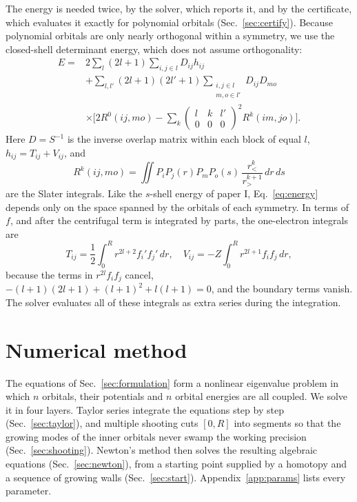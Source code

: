 \documentclass[aps,pra,reprint,superscriptaddress,amsmath,amssymb,longbibliography]{revtex4-2}
\begin{document}
The energy is needed twice, by the solver, which reports it, and by the certificate, which evaluates it exactly for polynomial orbitals (Sec.~\ref{sec:certify}). Because polynomial orbitals are only nearly orthogonal within a symmetry, we use the closed-shell determinant energy, which does not assume orthogonality:
\begin{equation}
\begin{split}
E={}&2\sum_l(2l+1)\sum_{i,j\in l}D_{ij}h_{ij}\\
&+\sum_{l,l'}(2l+1)(2l'+1)\sum_{\substack{i,j\in l\\m,o\in l'}}D_{ij}D_{mo}\\
&\times\Big[2R^0(ij,mo)-\sum_k\begin{pmatrix}l&k&l'\\0&0&0\end{pmatrix}^2R^k(im,jo)\Big].
\end{split}\label{eq:energy}
\end{equation}
Here $D=S^{-1}$ is the inverse overlap matrix within each block of equal $l$, $h_{ij}=T_{ij}+V_{ij}$, and
\begin{equation}
R^k(ij,mo)=\iint P_iP_j(r)P_mP_o(s)\,\frac{r_<^k}{r_>^{k+1}}\,dr\,ds
\end{equation}
are the Slater integrals. Like the $s$-shell energy of paper I, Eq.~\eqref{eq:energy} depends only on the space spanned by the orbitals of each symmetry. In terms of $f$, and after the centrifugal term is integrated by parts, the one-electron integrals are
\begin{equation}
T_{ij}=\frac12\int_0^Rr^{2l+2}f_i'f_j'\,dr,\quad V_{ij}=-Z\int_0^Rr^{2l+1}f_if_j\,dr, \label{eq:onebody}
\end{equation}
because the terms in $r^{2l}f_if_j$ cancel, $-(l+1)(2l+1)+(l+1)^2+l(l+1)=0$, and the boundary terms vanish. The solver evaluates all of these integrals as extra series during the integration.

\section{Numerical method}\label{sec:numerics}

The equations of Sec.~\ref{sec:formulation} form a nonlinear eigenvalue problem in which $n$ orbitals, their potentials and $n$ orbital energies are all coupled. We solve it in four layers. Taylor series integrate the equations step by step (Sec.~\ref{sec:taylor}), and multiple shooting cuts $[0,R]$ into segments so that the growing modes of the inner orbitals never swamp the working precision (Sec.~\ref{sec:shooting}). Newton's method then solves the resulting algebraic equations (Sec.~\ref{sec:newton}), from a starting point supplied by a homotopy and a sequence of growing walls (Sec.~\ref{sec:start}). Appendix~\ref{app:params} lists every parameter.
\end{document}

